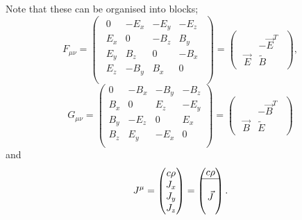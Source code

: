 \documentclass{article}
\begin{document}
Note that these can be organised into blocks;
\begin{equation}
    F_{\mu\nu} = \begin{pmatrix}
        \begin{array}{c|ccc}
            0 & -E_x & -E_y & -E_z \\ \hline
            E_x & 0 & -B_z & B_y \\
            E_y & B_z & 0 & -B_x \\
            E_z & -B_y & B_x & 0 \\
        \end{array}
    \end{pmatrix} = \begin{pmatrix}
        \begin{array}{c|c}
            & -\vec{E}^T \\ \hline
            \vec{E} & \tilde{B}
        \end{array}
    \end{pmatrix},
\end{equation}
\begin{equation}
    G_{\mu\nu} = \begin{pmatrix}
        0 & -B_x & -B_y & -B_z \\
        B_x & 0 & E_z & -E_y \\
        B_y & -E_z & 0 & E_x \\
        B_z & E_y & -E_x & 0 \\
    \end{pmatrix} = \begin{pmatrix}
        \begin{array}{c|c}
            & -\vec{B}^T \\ \hline
            \vec{B} & \tilde{E}
        \end{array}
    \end{pmatrix}
\end{equation}
and
\begin{equation}
    J^\mu = \begin{pmatrix}
        c \rho \\
        J_{x} \\
        J_{y} \\
        J_{z}
    \end{pmatrix}= \begin{pmatrix}
        c \rho \\
        \hline
        \\
        \vec{J}\\
        \\
    \end{pmatrix}.
\end{equation}
\end{document}
